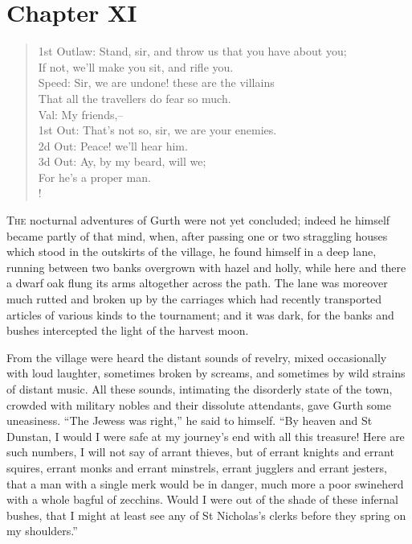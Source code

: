 \chapter{Chapter XI}

\begin{verse}
1st Outlaw: Stand, sir, and throw us that you have about you;\\
If not, we'll make you sit, and rifle you.\\
Speed: Sir, we are undone! these are the villains\\
That all the travellers do fear so much.\\
Val: My friends,--\\
1st Out: That's not so, sir, we are your enemies.\\
2d Out: Peace! we'll hear him.\\
3d Out: Ay, by my beard, will we;\\
For he's a proper man.\\!
\end{verse}

\lettrine{T}{he} nocturnal adventures of Gurth were not yet concluded;
indeed he
himself became partly of that mind, when, after passing one or two
straggling houses which stood in the outskirts of the village, he found
himself in a deep lane, running between two banks overgrown with hazel
and holly, while here and there a dwarf oak flung its arms altogether
across the path. The lane was moreover much rutted and broken up by the
carriages which had recently transported articles of various kinds to
the tournament; and it was dark, for the banks and bushes intercepted
the light of the harvest moon.

From the village were heard the distant sounds of revelry, mixed
occasionally with loud laughter, sometimes broken by screams, and
sometimes by wild strains of distant music. All these sounds, intimating
the disorderly state of the town, crowded with military nobles and their
dissolute attendants, gave Gurth some uneasiness. ``The Jewess was
right,'' he said to himself. ``By heaven and St Dunstan, I would I were
safe at my journey's end with all this treasure! Here are such numbers,
I will not say of arrant thieves, but of errant knights and errant
squires, errant monks and errant minstrels, errant jugglers and errant
jesters, that a man with a single merk would be in danger, much more a
poor swineherd with a whole bagful of zecchins. Would I were out of the
shade of these infernal bushes, that I might at least see any of St
Nicholas's clerks before they spring on my shoulders.''

